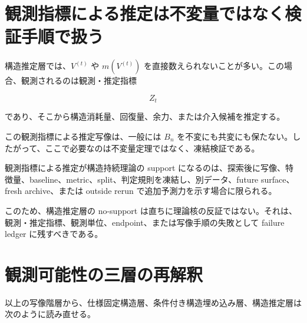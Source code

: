\documentclass[12pt,a4paper]{article}
\begin{document}
\section{観測指標による推定は不変量ではなく検証手順で扱う}\label{ux89b3ux6e2cux6307ux6a19ux306bux3088ux308bux63a8ux5b9aux306fux4e0dux5909ux91cfux3067ux306fux306aux304fux691cux8a3cux624bux9806ux3067ux6271ux3046}

構造推定層では、\(V^{(t)}\) や \(m(V^{(t)})\) を直接数えられないことが多い。この場合、観測されるのは観測・推定指標

\[
Z_{t}
\]

であり、そこから構造消耗量、回復量、余力、または介入候補を推定する。

この観測指標による推定写像は、一般には \(B_{n}\) を不変にも共変にも保たない。したがって、ここで必要なのは不変量定理ではなく、凍結検証である。

観測指標による推定が構造持続理論の support になるのは、探索後に写像、特徴量、baseline、metric、split、判定規則を凍結し、別データ、future surface、fresh archive、または outside rerun で追加予測力を示す場合に限られる。

このため、構造推定層の no-support は直ちに理論核の反証ではない。それは、観測・推定指標、観測単位、endpoint、または写像手順の失敗として failure ledger に残すべきである。

\section{観測可能性の三層の再解釈}\label{ux89b3ux6e2cux53efux80fdux6027ux306eux4e09ux5c64ux306eux518dux89e3ux91c8}

以上の写像階層から、仕様固定構造層、条件付き構造埋め込み層、構造推定層は次のように読み直せる。
\end{document}
